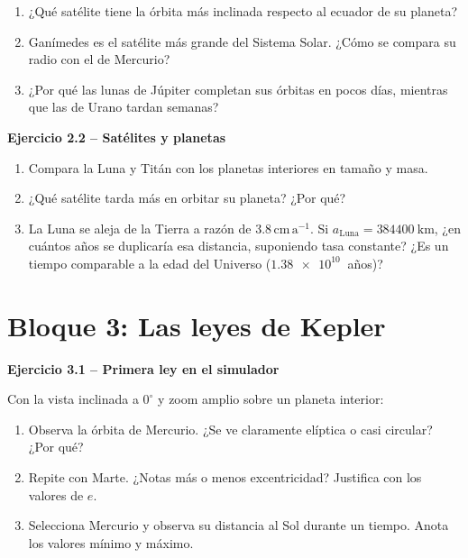 \documentclass[11pt,a4paper]{article}
\newenvironment{cajaEjercicio}[1][]{\par\medskip\noindent\textbf{#1}\par\smallskip}{\par\medskip}
\theoremstyle{definition}
\begin{document}
\begin{enumerate}[label=\alph*),leftmargin=*]
  \item ¿Qué satélite tiene la órbita más inclinada respecto al ecuador de su planeta?
  \item Ganímedes es el satélite más grande del Sistema Solar. ¿Cómo se compara su radio con el de Mercurio?
  \item ¿Por qué las lunas de Júpiter completan sus órbitas en pocos días, mientras que las de Urano tardan semanas?
\end{enumerate}

\begin{cajaEjercicio}[Ejercicio 2.2 -- Satélites y planetas]
\begin{enumerate}[label=\alph*),leftmargin=*]
  \item Compara la Luna y Titán con los planetas interiores en tamaño y masa.
  \item ¿Qué satélite tarda más en orbitar su planeta? ¿Por qué?
  \item La Luna se aleja de la Tierra a razón de $3.8\,\mathrm{cm\,a^{-1}}$. Si $a_{\text{Luna}} = \SI{384400}{\kilo\metre}$, ¿en cuántos años se duplicaría esa distancia, suponiendo tasa constante? ¿Es un tiempo comparable a la edad del Universo ($\SI{1.38e10}{}$ años)?
\end{enumerate}
\end{cajaEjercicio}

\section{Bloque 3: Las leyes de Kepler}

\begin{cajaEjercicio}[Ejercicio 3.1 -- Primera ley en el simulador]
Con la vista inclinada a $0^{\circ}$ y zoom amplio sobre un planeta interior:
\begin{enumerate}[label=\alph*),leftmargin=*]
  \item Observa la órbita de Mercurio. ¿Se ve claramente elíptica o casi circular? ¿Por qué?
  \item Repite con Marte. ¿Notas más o menos excentricidad? Justifica con los valores de $e$.
  \item Selecciona Mercurio y observa su distancia al Sol durante un tiempo. Anota los valores mínimo y máximo.
\end{enumerate}
\end{cajaEjercicio}
\end{document}
